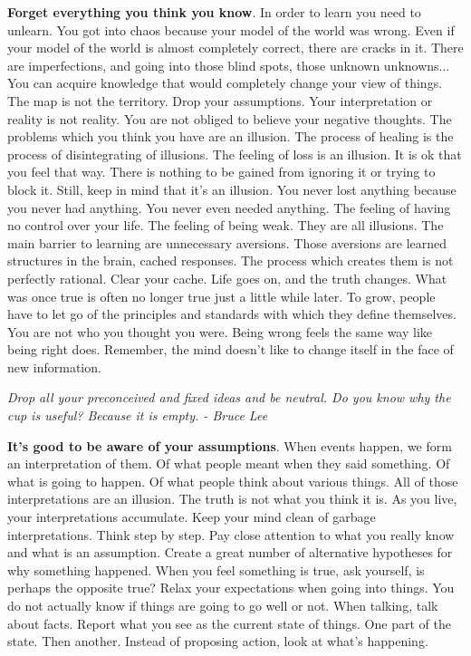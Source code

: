 \documentclass[a4paper,hidelinks]{article}
\begin{document}
\textbf{Forget everything you think you know}.
In order to learn you need to unlearn.
You got into chaos because your model of the world was wrong.
Even if your model of the world is almost completely correct, there are cracks in it.
There are imperfections, and going into those blind spots, those unknown unknowns...
You can acquire knowledge that would completely change your view of things.
The map is not the territory.
Drop your assumptions.
Your interpretation or reality is not reality.
You are not obliged to believe your negative thoughts.
The problems which you think you have are an illusion.
The process of healing is the process of disintegrating of illusions.
The feeling of loss is an illusion.
It is ok that you feel that way.
There is nothing to be gained from ignoring it or trying to block it.
Still, keep in mind that it's an illusion.
You never lost anything because you never had anything.
You never even needed anything.
The feeling of having no control over your life.
The feeling of being weak.
They are all illusions.
The main barrier to learning are unnecessary aversions.
Those aversions are learned structures in the brain, cached responses.
The process which creates them is not perfectly rational.
Clear your cache.
Life goes on, and the truth changes.
What was once true is often no longer true just a little while later.
To grow, people have to let go of the principles and standards with which they define themselves.
You are not who you thought you were.
Being wrong feels the same way like being right does.
Remember, the mind doesn't like to change itself in the face of new information.

\newpage

\begin{center}
\textit{
Drop all your preconceived and fixed ideas and be neutral. Do you know why the cup is useful? Because it is empty. - Bruce Lee
}
\end{center}

\textbf{It's good to be aware of your assumptions}.
When events happen, we form an interpretation of them.
Of what people meant when they said something.
Of what is going to happen.
Of what people think about various things.
All of those interpretations are an illusion.
The truth is not what you think it is.
As you live, your interpretations accumulate.
Keep your mind clean of garbage interpretations.
Think step by step.
Pay close attention to what you really know and what is an assumption.
Create a great number of alternative hypotheses for why something happened.
When you feel something is true, ask yourself, is perhaps the opposite true?
Relax your expectations when going into things.
You do not actually know if things are going to go well or not.
When talking, talk about facts. 
Report what you see as the current state of things. 
One part of the state.
Then another.
Instead of proposing action, look at what’s happening.
\end{document}
